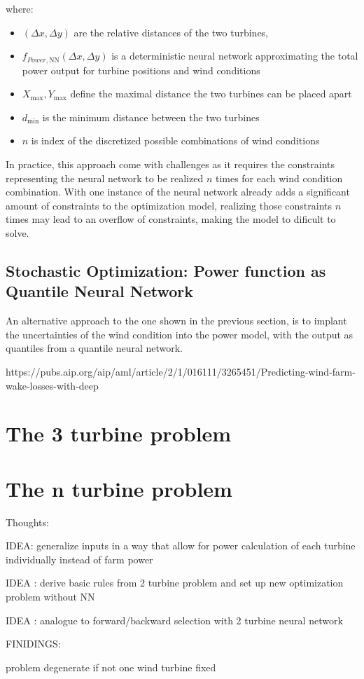 where:
\begin{itemize}
	\item \( (\Delta x, \Delta y) \) are the relative distances of the two turbines,
	\item \( f_{Power, \text{NN}}(\Delta x, \Delta y)\) is a deterministic neural network  approximating the total power output for turbine positions and wind conditions
	\item \(  X_{\max}, Y_{\max} \) define the maximal distance the two turbines can be placed apart
	\item \( d_{\min} \) is the minimum distance between the two turbines
	\item \( n \) is index of the discretized possible combinations of wind conditions 
\end{itemize}

In practice, this approach come with challenges as it requires the constraints representing the neural network to be realized $n$ times for each wind condition combination. With one instance of the neural network already adds a significant amount of constraints to the optimization model, realizing those constraints $n$ times may lead to an overflow of constraints, making the model to dificult to solve.
	
\subsection{Stochastic Optimization:  Power function as Quantile Neural Network}

An alternative approach to the one shown in the previous section, is to implant the uncertainties of the wind condition into the power model, with the output as quantiles from a quantile neural network. 


https://pubs.aip.org/aip/aml/article/2/1/016111/3265451/Predicting-wind-farm-wake-losses-with-deep

	

\section{The 3 turbine problem}

\section{The n turbine problem}

Thoughts: 

IDEA: generalize inputs in a way that allow for power calculation of each turbine individually instead of farm power

IDEA : derive basic rules from 2 turbine problem and set up new optimization problem without NN 

IDEA : analogue to forward/backward selection with 2 turbine neural network


FINIDINGS: 

problem degenerate if not one wind turbine fixed